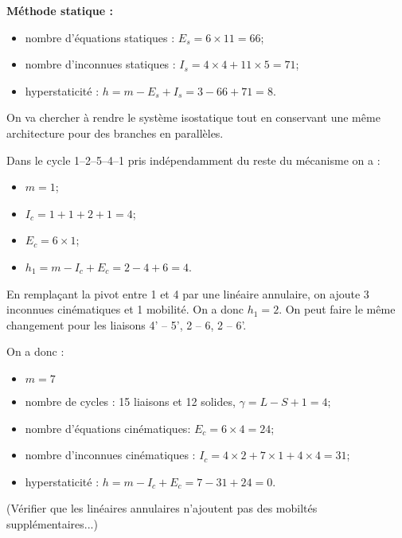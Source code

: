 \textbf{Méthode statique : }
\begin{itemize}
\item nombre d'équations statiques : $E_s = 6\times 11 = 66$;
\item nombre d'inconnues statiques : $I_s = 4 \times 4+ 11 \times 5 = 71$;
\item hyperstaticité : $h=m-E_s + I_s = 3 -66 + 71 = 8$.
\end{itemize}


\else 
\fi

\ifprof
On va chercher à rendre le système isostatique tout en conservant une même architecture pour des branches en parallèles.

Dans le cycle 1--2--5--4--1 pris indépendamment du reste du mécanisme on a :
\begin{itemize}
\item $m=1$;
\item $I_c = 1+1+2+1 = 4$;
\item $E_c =6 \times 1$;
\item $h_1 = m-I_c +E_c = 2 -4 +6 =4$. 
\end{itemize}

En remplaçant la pivot entre 1 et 4 par une linéaire annulaire, on ajoute 3 inconnues cinématiques et 1 mobilité. 
On a donc $h_1 = 2$. On peut faire le même changement pour les liaisons 4' -- 5', 2 -- 6, 2 -- 6'.

On a donc :
\begin{itemize}
\item $m=7$
\item nombre de cycles : 15 liaisons et 12 solides, $\gamma = L- S + 1 =4$;
\item nombre d'équations cinématiques: $E_c = 6\times 4 = 24$;
\item nombre d'inconnues cinématiques : $I_c = 4 \times 2+ 7 \times 1+ 4 \times 4 = 31$;
\item hyperstaticité : $h=m-I_c + E_c = 7 -31 + 24 = 0$.
\end{itemize}
  
(Vérifier que les linéaires annulaires n'ajoutent pas des mobiltés supplémentaires...)

\else 
\fi
 
 

\ifprof
\else
\ifcolle
\else
{} 
\fi

\fi